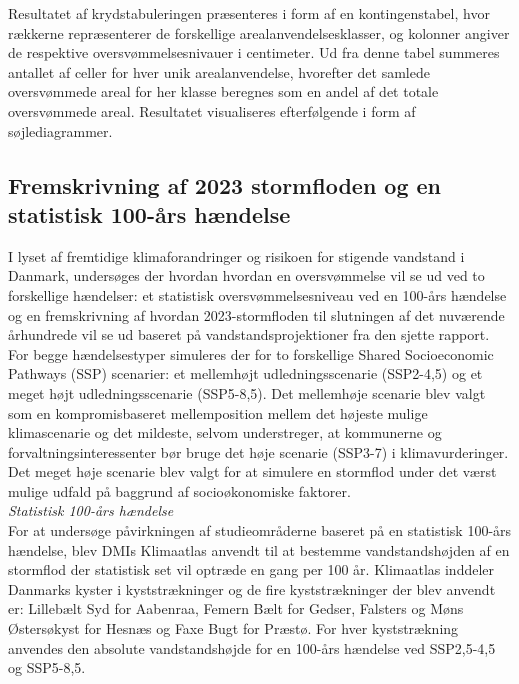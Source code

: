 Resultatet af krydstabuleringen præsenteres i form af en kontingenstabel, hvor rækkerne repræsenterer de forskellige arealanvendelsesklasser, og kolonner angiver de respektive oversvømmelsesnivauer i centimeter. Ud fra denne tabel summeres antallet af celler for hver unik arealanvendelse, hvorefter det samlede oversvømmede areal for her klasse beregnes som en andel af det totale oversvømmede areal. Resultatet visualiseres efterfølgende i form af søjlediagrammer.

\subsection{Fremskrivning af 2023 stormfloden og en statistisk 100-års hændelse} \label{Afsnit: Fremskrivning og statistisk}
I lyset af fremtidige klimaforandringer og risikoen for stigende vandstand i Danmark, undersøges der hvordan hvordan en oversvømmelse vil se ud ved to forskellige hændelser: et statistisk oversvømmelsesniveau ved en 100-års hændelse og en fremskrivning af hvordan 2023-stormfloden til slutningen af det nuværende århundrede vil se ud baseret på vandstandsprojektioner fra den sjette \cite{ipcc_report_AR6} rapport. For begge hændelsestyper simuleres der for to forskellige Shared Socioeconomic Pathways (SSP) scenarier: et mellemhøjt udledningsscenarie (SSP2-4,5) og et meget højt udledningsscenarie (SSP5-8,5). Det mellemhøje scenarie blev valgt som en kompromisbaseret mellemposition mellem det højeste mulige klimascenarie og det mildeste, selvom \cite{dmi_ny_nodate} understreger, at kommunerne og forvaltningsinteressenter bør bruge det høje scenarie (SSP3-7) i klimavurderinger. Det meget høje scenarie blev valgt for at simulere en stormflod under det værst mulige udfald på baggrund af socioøkonomiske faktorer.\\

{\large \textit{Statistisk 100-års hændelse}}\\
For at undersøge påvirkningen af studieområderne baseret på en statistisk 100-års hændelse, blev DMIs Klimaatlas anvendt til at bestemme vandstandshøjden af en stormflod der statistisk set vil optræde en gang per 100 år. Klimaatlas inddeler Danmarks kyster i kyststrækninger og de fire kyststrækninger der blev anvendt er: Lillebælt Syd for Aabenraa, Femern Bælt for Gedser, Falsters og Møns Østersøkyst for Hesnæs og Faxe Bugt for Præstø. For hver kyststrækning anvendes den absolute vandstandshøjde for en 100-års hændelse ved SSP2,5-4,5 og SSP5-8,5.\\

